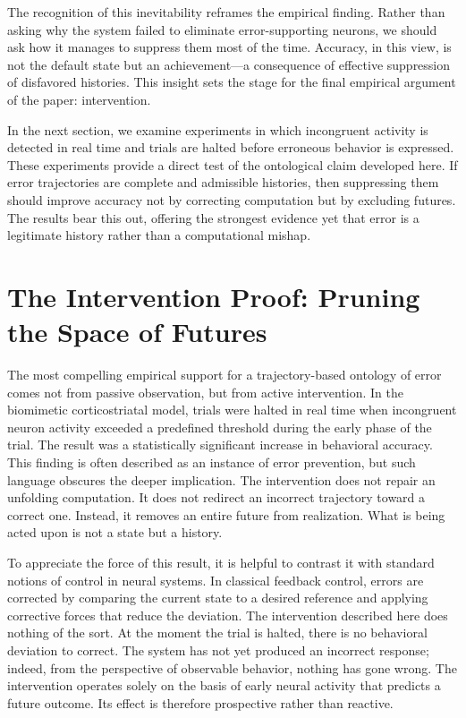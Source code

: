 \documentclass[11pt]{article}
\begin{document}
The recognition of this inevitability reframes the empirical finding. Rather than asking why the system failed to eliminate error-supporting neurons, we should ask how it manages to suppress them most of the time. Accuracy, in this view, is not the default state but an achievement—a consequence of effective suppression of disfavored histories. This insight sets the stage for the final empirical argument of the paper: intervention.

In the next section, we examine experiments in which incongruent activity is detected in real time and trials are halted before erroneous behavior is expressed. These experiments provide a direct test of the ontological claim developed here. If error trajectories are complete and admissible histories, then suppressing them should improve accuracy not by correcting computation but by excluding futures. The results bear this out, offering the strongest evidence yet that error is a legitimate history rather than a computational mishap.

\section{The Intervention Proof: Pruning the Space of Futures}

The most compelling empirical support for a trajectory-based ontology of error comes not from passive observation, but from active intervention. In the biomimetic corticostriatal model, trials were halted in real time when incongruent neuron activity exceeded a predefined threshold during the early phase of the trial. The result was a statistically significant increase in behavioral accuracy. This finding is often described as an instance of error prevention, but such language obscures the deeper implication. The intervention does not repair an unfolding computation. It does not redirect an incorrect trajectory toward a correct one. Instead, it removes an entire future from realization. What is being acted upon is not a state but a history.

To appreciate the force of this result, it is helpful to contrast it with standard notions of control in neural systems. In classical feedback control, errors are corrected by comparing the current state to a desired reference and applying corrective forces that reduce the deviation. The intervention described here does nothing of the sort. At the moment the trial is halted, there is no behavioral deviation to correct. The system has not yet produced an incorrect response; indeed, from the perspective of observable behavior, nothing has gone wrong. The intervention operates solely on the basis of early neural activity that predicts a future outcome. Its effect is therefore prospective rather than reactive.
\end{document}
